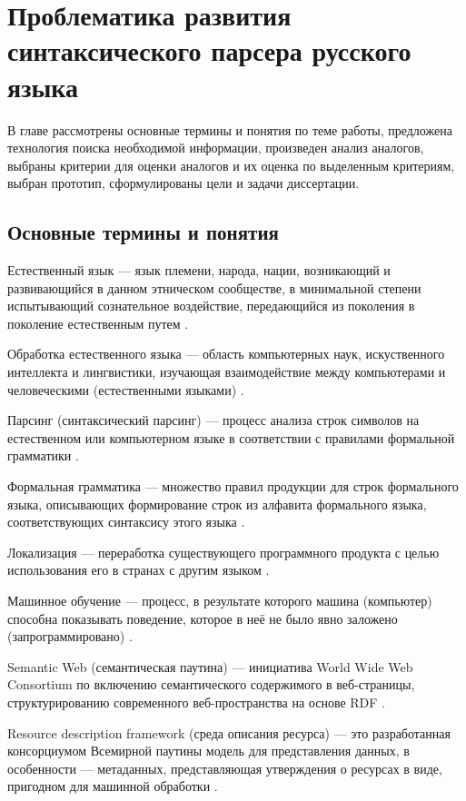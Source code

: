 ﻿\indent \section{Проблематика развития синтаксического парсера русского языка}
В главе рассмотрены основные термины и понятия по теме работы, предложена технология поиска необходимой информации, произведен анализ аналогов, выбраны критерии для оценки аналогов и их оценка по выделенным критериям, выбран прототип, сформулированы цели и задачи диссертации.

\subsection{Основные термины и понятия}
Естественный язык --- язык племени, народа, нации, возникающий и развивающийся в данном этническом сообществе, в минимальной степени испытывающий сознательное воздействие, передающийся из поколения в поколение естественным путем \cite{academica_nl}.

Обработка естественного языка --- область компьютерных наук, искуственного интеллекта и лингвистики, изучающая взаимодействие между компьютерами и человеческими (естественными языками) \cite{wiki_nlp}.

Парсинг (синтаксический парсинг) --- процесс анализа строк символов на естественном или компьютерном языке в соответствии с правилами формальной грамматики \cite{wiki_parsing}.

Формальная грамматика --- множество правил продукции для строк формального языка, описывающих формирование строк из алфавита формального языка, соответствующих синтаксису этого языка \cite{wiki_fg}.

Локализация --- переработка существующего программного продукта с целью использования его в странах с другим языком \cite{academica_loc}.

Машинное обучение --- процесс, в результате которого машина (компьютер) способна показывать поведение, которое в неё не было явно заложено (запрограммировано) \cite{samuel}.

Semantic Web (семантическая паутина) --- инициатива World Wide Web\\ Consortium по включению семантического содержимого в веб-страницы, структурированию современного веб-пространства на основе RDF \cite{wiki_semantic_web}.

Resource description framework (среда описания ресурса) --- это разработанная консорциумом Всемирной паутины модель для представления данных, в особенности --- метаданных, представляющая утверждения о ресурсах в виде, пригодном для машинной обработки \cite{wiki_rdf}. 

